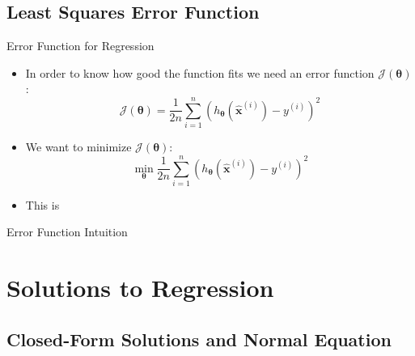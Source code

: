 \subsection{Least Squares Error Function}

\begin{frame}{Error Function for Regression}{}
	\begin{itemize}
		\item In order to know how good the function fits we need an error function $\mathcal{J}(\bm{\theta})$:
		\begin{equation}
			\mathcal{J}(\bm{\theta}) = \frac{1}{2n} \sum_{i=1}^n (h_{\bm{\theta}}(\bm{\widehat{x}}^{(i)}) - y^{(i)})^2
		\end{equation}
		\item We want to minimize $\mathcal{J}(\bm{\theta})$:
		\begin{equation*}
			\min_{\bm{\theta}} \frac{1}{2n} \sum_{i=1}^n (h_{\bm{\theta}}(\bm{\widehat{x}}^{(i)}) - y^{(i)})^2
		\end{equation*}
		\item This is 
	\end{itemize}
\end{frame}


\begin{frame}{Error Function Intuition}{}
	
\end{frame}


\section{Solutions to Regression}

\subsection{Closed-Form Solutions and Normal Equation}

